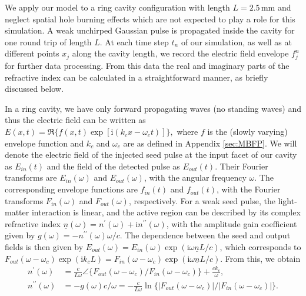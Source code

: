 \documentclass[10pt]{article}
\begin{document}
	We apply our model to a ring cavity configuration with length $L=2.5{\,}%
	\mathrm{mm}$ and neglect spatial hole burning effects which are not expected
	to play a role for this simulation. A weak unchirped Gaussian pulse is
	propagated inside the cavity for one round trip of length $L$. At each time step $t_{n}$ of our
	simulation, as well as at different points $x_{j}$ along the cavity length, we
	record the electric field envelope $f_{j}^{n}$ for further data processing.
	From this data the real and imaginary parts of the refractive index can be
	calculated in a straightforward manner, as briefly discussed below.
	
	In a ring cavity, we have only forward propagating waves (no standing waves)
	and thus the electric field can be written as
$
		E(x,t)=\Re\{f(x,t)\exp\left[  \mathrm{i}(k_{c}x-\omega_{c}t)\right]
		\} ,
$
	where $f$ is the (slowly varying) envelope function and $k_c$ and $\omega_c$ are as defined in Appendix \ref{sec:MBFP}. We will denote the
	electric field of the injected seed pulse at the input facet of our cavity as
	$E_{in}(t)$ and the field of the detected pulse as $E_{out}(t)$. Their Fourier
	transforms are $E_{in}(\omega)$ and $E_{out}(\omega)$, with the angular
	frequency $\omega$. The corresponding envelope functions are $f_{in}\left(
	t\right)  $ and $f_{out}\left(  t\right)  $, with the Fourier transforms
	$F_{in}\left(  \omega\right)  $ and $F_{out}\left(  \omega\right) $, respectively. For a
	weak seed pulse, the light-matter interaction is linear, and the active region
	can be described by its complex refractive index $\underline{n}\left(
	\omega\right)  =n^{\prime}\left(  \omega\right)  +\mathrm{i}n^{\prime\prime
	}\left(  \omega\right)  $, with the amplitude gain coefficient given by
	$g(\omega)=-n^{\prime\prime}(\omega)\omega/c$. The dependence between the seed
	and output fields is then given by $E_{out}(\omega)=E_{in}(\omega)\exp\left(
	\mathrm{i}\omega\underline{n}L/c\right)  $, which corresponds to
	$F_{out}(\omega-\omega_{c})\exp(\mathrm{i}k_{c}L)=F_{in}(\omega-\omega
	_{c})\exp\left(  \mathrm{i}\omega\underline{n}L/c\right)  $. From this, we
	obtain
	\begin{align}
		n^{\prime}(\omega)  & =\frac{c}{L\omega}\angle\{F_{out}(\omega-\omega
		_{c})/F_{in}(\omega-\omega_{c})\}+\frac{ck_{c}}{\omega}, \\
		n^{\prime\prime}(\omega)  &  =-g(\omega)c/\omega=-\frac{c}{L\omega}%
		\ln\{|F_{out}(\omega-\omega_{c})|/|F_{in}(\omega-\omega_{c})|\}.
		\label{eq:gaineq}%
	\end{align}
\end{document}
